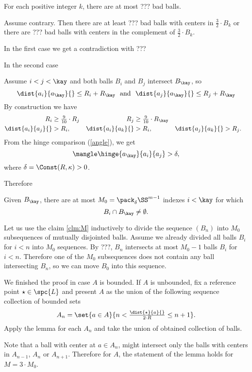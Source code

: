 \begin{clm}{}
For each positive integer $k$,
there are at most ??? bad balls.
\end{clm}



Assume contrary. Then there are at least ??? bad balls with centers in $\tfrac32 \cdot B_k$ or there are ??? bad balls with centers in the complement of $\tfrac32 \cdot B_k$.

In the first case we get a contradiction with ???

In the second case

Assume $i<j<\kay$ and both balls $B_i$ and $B_j$ intersect $B_\kay$,
so 
\[\dist{a_i}{a_\kay}{}\le R_i+R_\kay\ \ \text{and}\ \ \dist{a_j}{a_\kay}{}\le R_j+R_\kay\]
By construction we have
\begin{align*}
R_i
&\ge  
\tfrac{9}{10}\cdot R_j&
R_j
&\ge 
\tfrac{9}{10}\cdot R_\kay
\\
\dist{a_i}{a_j}{}&> R_i,&
\dist{a_i}{a_k}{}&> R_i,&
\dist{a_j}{a_k}{}&> R_j.
\end{align*}
From the hinge comparison (\ref{angle}), we get 
$$\mangle\hinge{a_\kay}{a_i}{a_j}>\delta,$$
where $\delta=\Const(R,\kappa)>0$.

Therefore
\begin{clm}{}\label{clm:M}
Given $B_\kay$, there are at most $M_0=\pack_\delta\SS^{m-1}$ indexes $i<\kay$ for which $$B_i\cap B_\kay\ne\emptyset.$$

\end{clm}
Let us use the claim \ref{clm:M} inductively to divide the sequence $(B_n)$ into $M_0$ subsequences of mutually disjointed balls.
Assume we already divided all balls $B_i$ for $i<n$ into $M_0$ sequences.
By ???,
$B_n$ intersects at most $M_0-1$  balls $B_i$ for $i<n$.
Therefore one of the $M_0$ subsequences does not contain any ball intersecting $B_n$, so we can move $B_0$ into this sequence.

We finished the proof in case $A$ is bounded.
If $A$ is unbounded, 
fix a reference point $\star\in \spc{L}$ 
and present $A$ as the union of the following sequence collection of bounded sets
\[A_n=\set{a\in A}{ n<\tfrac{\dist{\star}{a}{}}{2\cdot R}\le n+1}.\]
Apply the lemma for each $A_n$ and take the union of obtained collection of balls.

Note that a ball with center at $a\in A_n$, might intersect only the balls with centers in $A_{n-1}$, $A_n$ or $A_{n+1}$.
Therefore for $A$, the statement of the lemma holds for $M=3\cdot M_0$.
\qeds



